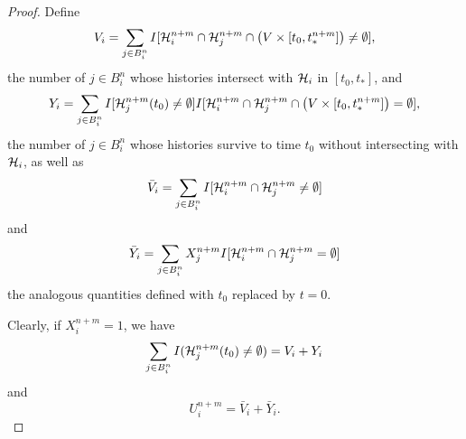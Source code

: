 \begin{proof}


		Define
		\begin{equation}
			V_i = \sum_{j \in B_i^n} I [\mathcal{H}_i^{n+m} \cap \mathcal{H}_j^{n+m} \cap \left(V \times [t_0, t_*^{n+m}] \right) \neq \emptyset],
		\end{equation}
		the number of $j \in B_i^n$ whose histories intersect with $\mathcal{H}_i$ in $[t_0, t_*]$, and
		\begin{equation}
			Y_i = \sum_{j \in B_i^n} I[\mathcal{H}_j^{n+m}(t_0) \neq \emptyset] I [\mathcal{H}_i^{n+m} \cap \mathcal{H}_j^{n+m} \cap \left(V \times [t_0, t_*^{n+m}] \right) = \emptyset],
		\end{equation}
		the number of $j \in B_i^n$ whose histories survive to time $t_0$ without intersecting with $\mathcal{H}_i$,
		as well as 
		\begin{equation}
			\bar{V}_i = \sum_{j \in B_i^n} I [\mathcal{H}_i^{n+m} \cap \mathcal{H}_j^{n+m}  \neq \emptyset]
		\end{equation}
		and
		\begin{equation}
			\bar{Y}_i = \sum_{j \in B_i^n} X_j^{n+m}  I [\mathcal{H}_i^{n+m} \cap \mathcal{H}_j^{n+m} = \emptyset]
		\end{equation}
		the analogous quantities defined with $t_0$ replaced by $t = 0$.

		Clearly, if $X_i^{n+m} = 1$, we have
		\begin{equation}
			\sum_{j \in B_i^n} I(\mathcal{H}_j^{n+m}(t_0) \neq \emptyset) = V_i + Y_i
		\end{equation}
		and
		\begin{equation}
			U_i^{n+m} = \bar{V}_i + \bar{Y}_i.
		\end{equation}


\end{proof}

